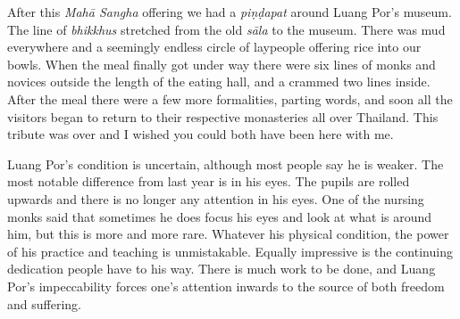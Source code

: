 After this \emph{Mahā Sangha} offering we had a \emph{piṇḍapat} around
Luang Por's museum. The line of \emph{bhikkhus} stretched from the old
\emph{sāla} to the museum. There was mud everywhere and a seemingly
endless circle of laypeople offering rice into our bowls. When the meal
finally got under way there were six lines of monks and novices outside
the length of the eating hall, and a crammed two lines inside. After the
meal there were a few more formalities, parting words, and soon all the
visitors began to return to their respective monasteries all over
Thailand. This tribute was over and I wished you could both have been
here with me. 

Luang Por's condition is uncertain, although most people say he is
weaker. The most notable difference from last year is in his eyes. The
pupils are rolled upwards and there is no longer any attention in his
eyes. One of the nursing monks said that sometimes he does focus his
eyes and look at what is around him, but this is more and more rare. 
Whatever his physical condition, the power of his practice and teaching
is unmistakable. Equally impressive is the continuing dedication people
have to his way. There is much work to be done, and Luang Por's
impeccability forces one's attention inwards to the source of both
freedom and suffering. 

